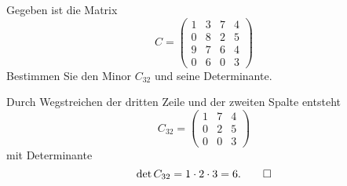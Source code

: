 Gegeben ist die Matrix
\[
C
=
\begin{pmatrix}
1 & 3 & 7 & 4 \\
0 & 8 & 2 & 5 \\
9 & 7 & 6 & 4 \\
0 & 6 & 0 & 3
\end{pmatrix}
\]
Bestimmen Sie den Minor $C_{32}$ und seine Determinante.

\begin{loesung}
Durch Wegstreichen der dritten Zeile und der zweiten Spalte entsteht
\[
C_{32}
=
\begin{pmatrix}
1 & 7 & 4 \\
0 & 2 & 5 \\
0 & 0 & 3
\end{pmatrix}
\]
mit Determinante
\[
\det C_{32}
=
1\cdot 2 \cdot 3
=
6.
\qedhere
\]
\end{loesung}
